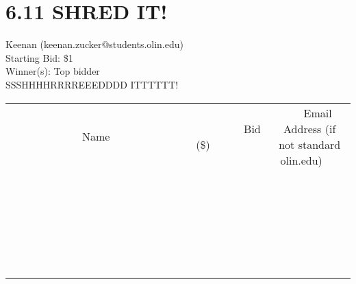 \documentclass[11pt]{article}
\begin{document}
\section*{6.11 SHRED IT!}
Keenan  (keenan.zucker@students.olin.edu) \\
Starting Bid: \$1 \\
Winner(s): 
Top bidder \\
SSSHHHHRRRREEEDDDD ITTTTTT! \\[6ex]
\begin{tabular}{c c c}
~~~~~~~~~~~~~Name~~~~~~~~~~~~~ & ~~~~~~~~~Bid (\$)~~~~~~~~~ & ~~~Email Address (if not standard olin.edu)~~~ \\
 & & \\
\hline
 & & \\
\hline
 & & \\
\hline
 & & \\
\hline
 & & \\
\hline
 & & \\
\hline
 & & \\
\hline
 & & \\
\hline
 & & \\
\hline
 & & \\
\hline
 & & \\
\hline
 & & \\
\hline
 & & \\
\hline
 & & \\
\hline
 & & \\
\hline
 & & \\
\hline
 & & \\
\hline
 & & \\
\hline
 & & \\
\hline
 & & \\
\hline
 & & \\
\hline
 & & \\
\hline
 & & \\
\hline
 & & \\
\hline
 & & \\
\hline
 & & \\
\hline
\end{tabular}
\clearpage
\end{document}
